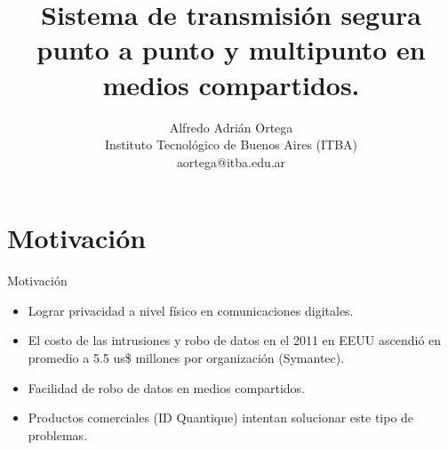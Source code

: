 \documentclass[aspectratio=169]{beamer}
\begin{document}
\title{\textbf{Sistema de transmisión segura punto a punto y multipunto en medios compartidos.}}


\author{\small Alfredo Adrián Ortega\\
Instituto Tecnológico de Buenos Aires (ITBA) \\
     aortega@itba.edu.ar\\    }








\section{Motivación}

\begin{frame}{Motivación}

\begin{itemize}
 \item Lograr privacidad a nivel físico en comunicaciones digitales.
 \item El costo de las intrusiones y robo de datos en el 2011 en EEUU ascendió en promedio a 5.5 us\$ millones por organización (Symantec).
 \item Facilidad de robo de datos en medios compartidos.
 \item Productos comerciales (ID Quantique) intentan solucionar este tipo de problemas. 
 \end{itemize}

  

\end{frame}
\end{document}
